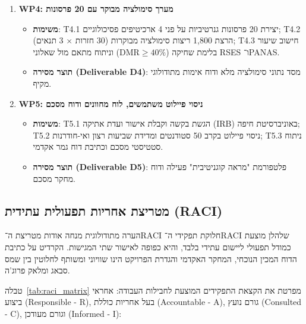 \begin{enumerate}
    \item \textbf{\textenglish{WP4}: מערך סימולציה מבוקר עם 20 פרסונות}
    \begin{itemize}
        \item \textbf{משימות}: \textenglish{T4.1} יצירת 20 פרסונות גנרטיביות על פני 4 ארכיטיפים פסיכולוגיים; \textenglish{T4.2} הרצת 1,800 ריצות סימולציה מבוקרות (30 חזרות $\times$ 3 תנאים); \textenglish{T4.3} חישוב שיעור בלימת שחיקה ($\text{DMR} \ge 40\%$) וניתוח מתאם מול שאלוני \textenglish{RSES} ו־\textenglish{PANAS}.
        \item \textbf{תוצר מסירה (\textenglish{Deliverable D4})}: מסד נתוני סימולציה מלא ודוח אימות מתודולוגי מקיף.
    \end{itemize}

    \item \textbf{\textenglish{WP5}: ניסוי פיילוט משתמשים, לוח מחוונים ודוח מסכם}
    \begin{itemize}
        \item \textbf{משימות}: \textenglish{T5.1} הגשת בקשה וקבלת אישור ועדת אתיקה (\textenglish{IRB}) באוניברסיטת חיפה; \textenglish{T5.2} ניסוי פיילוט בקרב 50 סטודנטים ומדידת שביעות רצון ואי-חודרנות; \textenglish{T5.3} ניתוח סטטיסטי מסכם וכתיבת דוח גמר אקדמי.
        \item \textbf{תוצר מסירה (\textenglish{Deliverable D5})}: פלטפורמת "מראה קוגניטיבית" פעילה ודוח מחקר מסכם.
    \end{itemize}
\end{enumerate}

\subsection{מטריצת אחריות תפעולית עתידית (RACI)}
\label{subsec:impl_raci_matrix}

\begin{agentbox}{הערה מתודולוגית מנחה אודות מטריצת ה־RACI}
חלוקת תפקידי ה־\textenglish{RACI} שלהלן מוצעת כמודל תפעולי ליישום עתידי בלבד, והיא כפופה לאישור שתי המגישות. הקרדיט על כתיבת הדוח המכין הנוכחי, המחקר האקדמי והגדרת הפרויקט הינו שוויוני ומשותף לחלוטין בין שמס סבאג ומלאק פרוג'ה.
\end{agentbox}

טבלה~\ref{tab:raci_matrix} מפרטת את הקצאת התפקידים המוצעת לחבילות העבודה: אחראי ביצוע (\textenglish{Responsible - R}), בעל אחריות כוללת (\textenglish{Accountable - A}), גורם נועץ (\textenglish{Consulted - C}), וגורם מעודכן (\textenglish{Informed - I}):

